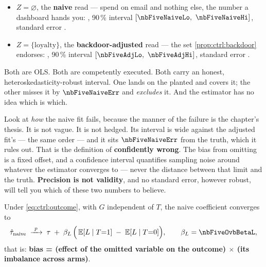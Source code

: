 

\begin{itemize}[leftmargin=*, itemsep=.2em]
  \item $Z = \varnothing$, the \textbf{naive} read --- spend on email and nothing else, the
        number a dashboard hands you: \eur{\nbFiveNaiveEst}, 90\,\% interval
        $[\nbFiveNaiveLo,\ \nbFiveNaiveHi]$, standard error \eur{\nbFiveNaiveSe}.
  \item $Z = \{\text{loyalty}\}$, the \textbf{backdoor-adjusted} read --- the set
        \cref{prop:ctrl:backdoor} endorses: \eur{\nbFiveAdjEst}, 90\,\% interval
        $[\nbFiveAdjLo,\ \nbFiveAdjHi]$, standard error \eur{\nbFiveAdjSe}.
\end{itemize}

Both are OLS. Both are competently executed. Both carry an honest, heteroskedasticity-robust
interval. One lands on the planted \eur{\nbFiveTrueAte} and covers it; the other misses it by
$\nbFiveNaiveErr$ and \emph{excludes} it. And the estimator has no idea which is which.

Look at \emph{how} the naive fit fails, because the manner of the failure is the chapter's
thesis. It is not vague. It is not hedged. Its interval is \eur{\nbFiveNaiveWidth} wide against
the adjusted fit's \eur{\nbFiveAdjWidth} --- the same order --- and it sits $\nbFiveNaiveErr$
from the truth, which it rules out. That is the definition of \textbf{confidently wrong}.
The bias from omitting  is a fixed offset, and a confidence interval quantifies
sampling noise around whatever the estimator converges to --- never the distance between that
limit and the truth. \textbf{Precision is not validity}, and no standard error, however robust,
will tell you which of these two numbers to believe.

\begin{proposition}\label{prop:ctrl:ovb}
Under \cref{eq:ctrl:outcome}, with $G$ independent of $T$, the naive coefficient converges to
%
\begin{equation}
  \hat\tau_{\text{naive}} \;\xrightarrow{\ p\ }\;
  \tau \;+\; \beta_L\,\Big(\E[L \mid T{=}1] \;-\; \E[L \mid T{=}0]\Big),
  \qquad \beta_L = \nbFiveOvbBetaL ,
  \label{eq:ctrl:ovb}
\end{equation}
%
that is: \textbf{bias = (effect of the omitted variable on the outcome) $\times$ (its imbalance
across arms)}.
\end{proposition}

